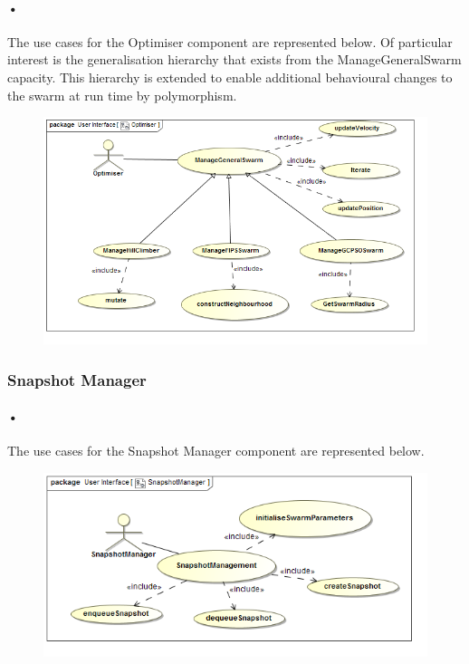 \documentclass[11pt]{article}
\begin{document}
\paragraph{•}
The use cases for the Optimiser component are represented below.
Of particular interest is the generalisation hierarchy that exists from the ManageGeneralSwarm capacity. This hierarchy is extended to enable additional behavioural changes to the swarm at run time by polymorphism.
\begin{figure}[H]
	\includegraphics[scale=0.50]{Optimiser.png}
\end{figure}

\subsubsection{Snapshot Manager}
\paragraph{•}
The use cases for the Snapshot Manager component are represented below.
\begin{figure}[H]
	\includegraphics[scale=0.55]{SnapshotManager.png}
\end{figure}
\end{document}
